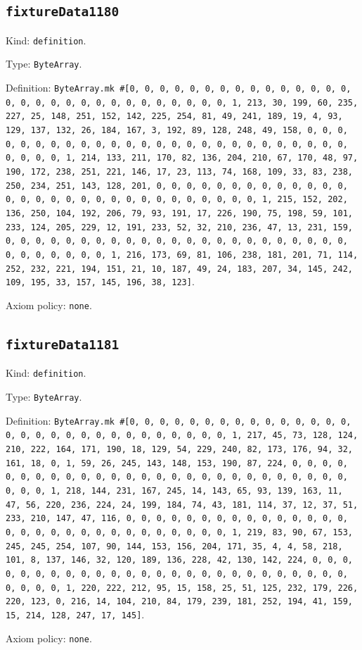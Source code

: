 \documentclass[11pt]{article}
\begin{document}
\subsection*{\texttt{fixtureData1180}}
\noindent Kind: \texttt{definition}.\par
\noindent Type: \texttt{ByteArray}.\par
\noindent Definition: \texttt{ByteArray.mk \#[0, 0, 0, 0, 0, 0, 0, 0, 0, 0, 0, 0, 0, 0, 0, 0, 0, 0, 0, 0, 0, 0, 0, 0, 0, 0, 0, 0, 0, 0, 1, 213, 30, 199, 60, 235, 227, 25, 148, 251, 152, 142, 225, 254, 81, 49, 241, 189, 19, 4, 93, 129, 137, 132, 26, 184, 167, 3, 192, 89, 128, 248, 49, 158, 0, 0, 0, 0, 0, 0, 0, 0, 0, 0, 0, 0, 0, 0, 0, 0, 0, 0, 0, 0, 0, 0, 0, 0, 0, 0, 0, 0, 0, 0, 1, 214, 133, 211, 170, 82, 136, 204, 210, 67, 170, 48, 97, 190, 172, 238, 251, 221, 146, 17, 23, 113, 74, 168, 109, 33, 83, 238, 250, 234, 251, 143, 128, 201, 0, 0, 0, 0, 0, 0, 0, 0, 0, 0, 0, 0, 0, 0, 0, 0, 0, 0, 0, 0, 0, 0, 0, 0, 0, 0, 0, 0, 0, 0, 1, 215, 152, 202, 136, 250, 104, 192, 206, 79, 93, 191, 17, 226, 190, 75, 198, 59, 101, 233, 124, 205, 229, 12, 191, 233, 52, 32, 210, 236, 47, 13, 231, 159, 0, 0, 0, 0, 0, 0, 0, 0, 0, 0, 0, 0, 0, 0, 0, 0, 0, 0, 0, 0, 0, 0, 0, 0, 0, 0, 0, 0, 0, 0, 1, 216, 173, 69, 81, 106, 238, 181, 201, 71, 114, 252, 232, 221, 194, 151, 21, 10, 187, 49, 24, 183, 207, 34, 145, 242, 109, 195, 33, 157, 145, 196, 38, 123]}.\par
\noindent Axiom policy: \texttt{none}.\par
\subsection*{\texttt{fixtureData1181}}
\noindent Kind: \texttt{definition}.\par
\noindent Type: \texttt{ByteArray}.\par
\noindent Definition: \texttt{ByteArray.mk \#[0, 0, 0, 0, 0, 0, 0, 0, 0, 0, 0, 0, 0, 0, 0, 0, 0, 0, 0, 0, 0, 0, 0, 0, 0, 0, 0, 0, 0, 0, 1, 217, 45, 73, 128, 124, 210, 222, 164, 171, 190, 18, 129, 54, 229, 240, 82, 173, 176, 94, 32, 161, 18, 0, 1, 59, 26, 245, 143, 148, 153, 190, 87, 224, 0, 0, 0, 0, 0, 0, 0, 0, 0, 0, 0, 0, 0, 0, 0, 0, 0, 0, 0, 0, 0, 0, 0, 0, 0, 0, 0, 0, 0, 0, 1, 218, 144, 231, 167, 245, 14, 143, 65, 93, 139, 163, 11, 47, 56, 220, 236, 224, 24, 199, 184, 74, 43, 181, 114, 37, 12, 37, 51, 233, 210, 147, 47, 116, 0, 0, 0, 0, 0, 0, 0, 0, 0, 0, 0, 0, 0, 0, 0, 0, 0, 0, 0, 0, 0, 0, 0, 0, 0, 0, 0, 0, 0, 0, 1, 219, 83, 90, 67, 153, 245, 245, 254, 107, 90, 144, 153, 156, 204, 171, 35, 4, 4, 58, 218, 101, 8, 137, 146, 32, 120, 189, 136, 228, 42, 130, 142, 224, 0, 0, 0, 0, 0, 0, 0, 0, 0, 0, 0, 0, 0, 0, 0, 0, 0, 0, 0, 0, 0, 0, 0, 0, 0, 0, 0, 0, 0, 0, 1, 220, 222, 212, 95, 15, 158, 25, 51, 125, 232, 179, 226, 220, 123, 0, 216, 14, 104, 210, 84, 179, 239, 181, 252, 194, 41, 159, 15, 214, 128, 247, 17, 145]}.\par
\noindent Axiom policy: \texttt{none}.\par
\end{document}
